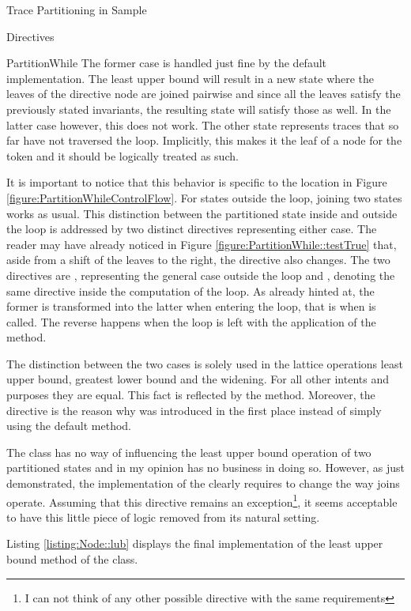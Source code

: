 \begin{chapter}{Trace Partitioning in Sample}
\begin{section}{Directives}
\begin{subsection}{PartitionWhile}
			The former case is handled just fine by the default implementation. The least upper bound will result in a new state where the leaves of the directive node are joined pairwise and since all the leaves satisfy the previously stated invariants, the resulting state will satisfy those as well. In the latter case however, this does not work. The other state represents traces that so far have not traversed the loop. Implicitly, this makes it the leaf of a  node for the token  and it should be logically treated as such. 
			
			It is important to notice that this behavior is specific to the location \three in Figure \ref{figure:PartitionWhileControlFlow}. For states outside the loop, joining two states works as usual. This distinction between the partitioned state inside and outside the loop is addressed by two distinct directives representing either case. The reader may have already noticed in Figure \ref{figure:PartitionWhile::testTrue} that, aside from a shift of the leaves to the right, the directive also changes. The two directives are , representing the general case outside the loop and , denoting the same directive inside the computation of the loop. As already hinted at, the former is transformed into the latter when entering the loop, that is when  is called. The reverse happens when the loop is left with the application of the  method.

			The distinction between the two cases is solely used in the lattice operations least upper bound, greatest lower bound and the widening. For all other intents and purposes they are equal. This fact is reflected by the  method. Moreover, the  directive is the reason why  was introduced in the first place instead of simply using the default \code{==} method.

			The  class has no way of influencing the least upper bound operation of two partitioned states and in my opinion has no business in doing so. However, as just demonstrated, the implementation of the  clearly requires to change the way joins operate. Assuming that this directive remains an exception\footnote{I can not think of any other possible directive with the same requirements}, it seems acceptable to have this little piece of logic removed from its natural setting.

			Listing \ref{listing:Node::lub} displays the final implementation of the least upper bound method of the  class.


\end{subsection}
\end{section}
\end{chapter}
